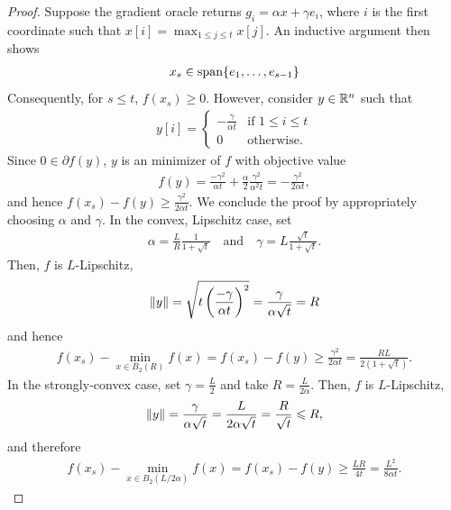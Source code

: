 \begin{proof}
Suppose the gradient oracle returns $g_i = \alpha x + \gamma e_i$, where
$i$ is the first coordinate such that $x[i] = \max_{1 \leq j \leq t} x[j]$. 
An inductive argument then shows
\begin{align*}
    x_s \in \mathop{\rm span}\{e_1, \dots, e_{s-1}\}
\end{align*}
Consequently, for $s \leq t$, $f(x_s) \geq 0$. However, consider $y\in \mathbb{R}^n$
such that
\begin{align*}
    y[i] = 
    \begin{cases}
        -\frac{\gamma}{\alpha t} &\text{if } 1 \leq i \leq t\\
        0 &\text{otherwise}.
    \end{cases}
\end{align*}
Since $0 \in \partial f(y)$, $y$ is an minimizer of $f$ with objective value
\begin{align*}
    f(y)
    = \frac{-\gamma^2}{\alpha t} + \frac{\alpha}{2}\frac{\gamma^2}{\alpha^2 t}
    = -\frac{\gamma^2}{2\alpha t},
\end{align*}
and hence $f(x_s) - f(y) \geq \frac{\gamma^2}{2 \alpha t}$.
We conclude the proof by appropriately choosing $\alpha$ and $\gamma$. 
In the convex, Lipschitz case, set 
\begin{align*}
    \alpha = \frac{L}{R} \frac{1}{1 + \sqrt{t}}
    \quad
    \text{and}
    \quad
    \gamma = L \frac{\sqrt{t}}{1 + \sqrt{t}}.
\end{align*}
Then, $f$ is $L$-Lipschitz, 
\begin{align*}
    \lVert y\rVert 
    = \sqrt{t \left(\frac{-\gamma}{\alpha t} \right )^2}
    = \frac{\gamma}{\alpha \sqrt{t}}
    = R
\end{align*}
and hence
\begin{align*}
    f(x_s) - \min_{x \in B_2(R)} f(x)
    = f(x_s) - f(y)
    \geq \frac{\gamma^2}{2\alpha t}
    = \frac{RL}{2(1+\sqrt{t})}.
\end{align*}
In the strongly-convex case, set $\gamma = \frac{L}{2}$ and take
$R = \frac{L}{2\alpha}$. Then, $f$ is $L$-Lipschitz, 
\begin{align*}
    \lVert y\rVert 
    = \frac{\gamma}{\alpha \sqrt{t}}
    = \frac{L}{2\alpha \sqrt{t}}
    = \frac{R}{\sqrt{t}}
    \leqslant R,
\end{align*}
and therefore
\begin{align*}
    f(x_s) - \min_{x \in B_2(L/2\alpha)} f(x)
    = f(x_s) - f(y)
    \geq \frac{LR}{4t} 
    = \frac{L^2}{8\alpha t}.
\end{align*}
\end{proof}

